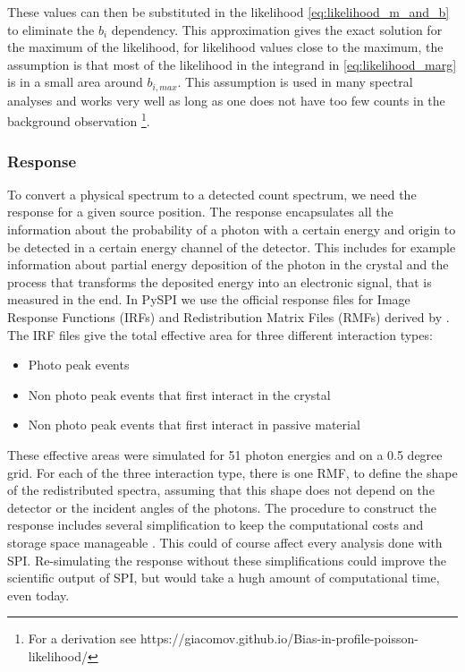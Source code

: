 \documentclass[twocolumn]{aa}
\begin{document}
These values can then be substituted in the likelihood \ref{eq:likelihood_m_and_b} to eliminate the $b_{i}$ dependency. This approximation gives the exact solution for the maximum of the likelihood, for likelihood values close to the maximum, the assumption is that most of the likelihood in the integrand in \ref{eq:likelihood_marg} is in a small area around $b_{i,max}$. This assumption is used in many spectral analyses and works very well as long as one does not have too few counts in the background observation \footnote{For a derivation see https://giacomov.github.io/Bias-in-profile-poisson-likelihood/}.

\subsubsection*{Response}

To convert a physical spectrum to a detected count spectrum, we need the response for a given source position. The response encapsulates all the information about the probability of a photon with a certain energy and origin to be detected in a certain energy channel of the detector. This includes for example information about partial energy deposition of the photon in the crystal and the process that transforms the deposited energy into an electronic signal, that is measured in the end.
In PySPI we use the official response files for Image Response Functions (IRFs) and Redistribution Matrix Files (RMFs) derived by \citet{spi_response}. The IRF files give the total effective area for three different interaction types:
\begin{itemize}
  \item Photo peak events
  \item Non photo peak events that first interact in the crystal
  \item Non photo peak events that first interact in passive material
\end{itemize}

These effective areas were simulated for 51 photon energies and on a 0.5 degree grid. For each of the three interaction type, there is one RMF, to define the shape of the redistributed spectra, assuming that this shape does not depend on the detector or the incident angles of the photons. The procedure to construct the response includes several simplification to keep the computational costs and storage space manageable \citep{spi_response}. This could of course affect every analysis done with SPI. Re-simulating the response without these simplifications could improve the scientific output of SPI, but would take a hugh amount of computational time, even today.
\end{document}

